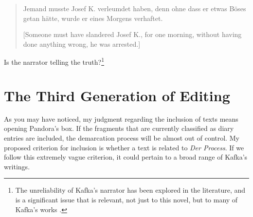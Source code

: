\documentclass{article}
\begin{document}
\begin{quote}
Jemand musste Josef K. verleumdet haben, denn ohne dass er etwas Böses
getan hätte, wurde er eines Morgens verhaftet. 

\begin{flushright}
    \parencite[7]{kafka_proces_1990-1}
\end{flushright}

{[}Someone must have slandered Josef K., for one morning, without having
done anything wrong, he was arrested.{]} 

\begin{flushright}
    \parencite[5]{kafka_trial_2009}
\end{flushright}

\end{quote}

Is the narrator telling the truth?\footnote{The unreliability of Kafka's narrator has been explored in the literature, and is a significant issue that is relevant, not just to this novel, but to many of Kafka's works \citep[see][]{myojo_kafka_2014}.}

\section{The Third Generation of
Editing}\label{the-third-generation-of-editing}

As you may have noticed, my judgment regarding the inclusion of texts
means opening Pandora's box. If the fragments that are currently
classified as diary entries are included, the demarcation process will
be almost out of control. My proposed criterion for inclusion is whether
a text is related to \emph{Der Process}. If we follow this extremely
vague criterion, it could pertain to a broad range of Kafka's writings.
\end{document}

